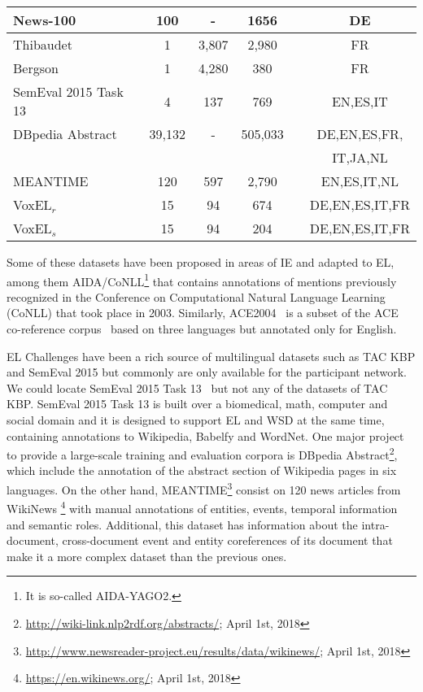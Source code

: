 \documentclass{llncs}
\newcommand{\cmark}{\ding{51}}%
\newcommand{\xmark}{\ding{55}}%
\begin{document}
\begin{table}[tb!]
\begin{tabular}{lccccc}
News-100~\cite{n3}                  &100     &-      &1656    &\cmark  &DE \\\midrule
Thibaudet~\cite{renden2016}         &1       &3,807  &2,980   &\xmark  &FR \\\midrule
Bergson~\cite{renden2016}           &1       &4,280  &380     &\xmark  &FR \\\midrule
SemEval 2015 
Task 13~\cite{moro2015semeval}      &4       &137    &769     &\cmark &EN,ES,IT \\ \midrule
DBpedia Abstract
~\cite{abstracts2016}               &39,132  &-      &505,033 &\xmark &DE,EN,ES,FR, \\
                                    &        &       &        &       &IT,JA,NL \\\midrule
MEANTIME \cite{meantime2016}        &120     &597    &2,790   &\xmark &EN,ES,IT,NL \\\midrule 
VoxEL$_r$                           &15      &94     &674     &\cmark &DE,EN,ES,IT,FR\\\midrule  
VoxEL$_s$                           &15      &94     &204     &\cmark &DE,EN,ES,IT,FR\\ 
\bottomrule
\end{tabular}
\end{table}


Some of these datasets have been proposed in areas of IE and adapted to EL, among them AIDA/CoNLL\footnote{It is so-called AIDA-YAGO2.} that contains annotations of mentions previously recognized in the Conference on Computational Natural Language Learning (CoNLL) that took place in 2003. Similarly, ACE2004~\cite{ace04} is a subset of the ACE co-reference corpus~\cite{ace04_old} based on three languages but annotated only for English. 

EL Challenges have been a rich source of multilingual datasets such as TAC KBP and SemEval 2015 but commonly are only available for the participant network. %
We could locate SemEval 2015 Task 13~\cite{moro2015semeval} but not any of the datasets of TAC KBP. SemEval 2015 Task 13 is built over a biomedical, math, computer and social domain and it is designed to support EL and WSD at the same time, containing annotations to Wikipedia, Babelfy and WordNet.
One major project to provide a large-scale training and evaluation corpora is DBpedia Abstract\footnote{\url{http://wiki-link.nlp2rdf.org/abstracts/}; April 1st, 2018}\cite{abstracts2016}, which include the annotation of the abstract section of Wikipedia pages in six languages. On the other hand, MEANTIME\footnote{\url{http://www.newsreader-project.eu/results/data/wikinews/}; April 1st, 2018} consist on 120 news articles from WikiNews \footnote{\url{https://en.wikinews.org/}; April 1st, 2018} with manual annotations of entities, events, temporal information and semantic roles. Additional, this dataset has information about the intra-document, cross-document event and entity coreferences of its document that make it a more complex dataset than the previous ones.
\end{document}
